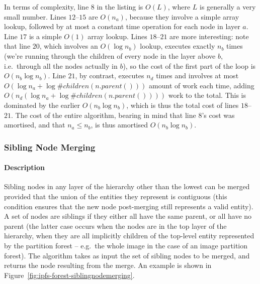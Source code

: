 In terms of complexity, line $8$ in the listing is $O(L)$, where $L$ is generally a very small number. Lines $12$--$15$ are $O(n_a)$, because they involve a simple array lookup, followed by at most a constant time operation for each node in layer $a$. Line $17$ is a simple $O(1)$ array lookup. Lines $18$--$21$ are more interesting: note that line $20$, which involves an $O(\log n_b)$ lookup, executes exactly $n_b$ times (we're running through the children of every node in the layer above $b$, i.e.~through all the nodes actually in $b$), so the cost of the first part of the loop is $O(n_b \log n_b)$. Line $21$, by contrast, executes $n_d$ times and involves at most $O(\log n_a + \log \#\mathit{children}(\mathit{n.parent()}))$ amount of work each time, adding $O(n_d (\log n_a + \log \#\mathit{children}(\mathit{n.parent()})))$ work to the total. This is dominated by the earlier $O(n_b \log n_b)$, which is thus the total cost of lines $18$--$21$. The cost of the entire algorithm, bearing in mind that line $8$'s cost was amortised, and that $n_a \le n_b$, is thus amortised $O(n_b \log n_b)$.


\afterpage{\clearpage}
\newpage

\subsubsection{Sibling Node Merging}


\paragraph{Description}

Sibling nodes in any layer of the hierarchy other than the lowest can be merged provided that the union of the entities they represent is contiguous (this condition ensures that the new node post-merging still represents a valid entity). A set of nodes are siblings if they either all have the same parent, or all have no parent (the latter case occurs when the nodes are in the top layer of the hierarchy, when they are all implicitly children of the top-level entity represented by the partition forest -- e.g.~the whole image in the case of an image partition forest). The algorithm takes as input the set of sibling nodes to be merged, and returns the node resulting from the merge. An example is shown in Figure~\ref{fig:ipfs-forest-siblingnodemerging}.

